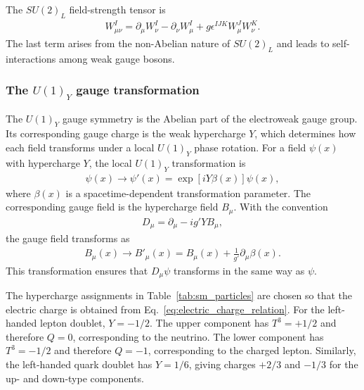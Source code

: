 The $SU(2)_{L}$ field-strength tensor is
\begin{align}
    W_{\mu\nu}^{I}
    =
    \partial_{\mu}W_{\nu}^{I}
    -
    \partial_{\nu}W_{\mu}^{I}
    +
    g\epsilon^{IJK}W_{\mu}^{J}W_{\nu}^{K}.
    \label{eq:su2l_field_strength}
\end{align}
The last term arises from the non-Abelian nature of $SU(2)_{L}$ and leads to self-interactions among weak gauge bosons.


\subsubsection{The $U(1)_{Y}$ gauge transformation}
\label{subsec:u1y_transformation}

The $U(1)_{Y}$ gauge symmetry is the Abelian part of the electroweak gauge group. 
Its corresponding gauge charge is the weak hypercharge $Y$, which determines how each field transforms under a local $U(1)_{Y}$ phase rotation. 
For a field $\psi(x)$ with hypercharge $Y$, the local $U(1)_{Y}$ transformation is
\begin{align}
    \psi(x)
    \rightarrow
    \psi'(x)
    =
    \exp\left[iY\beta(x)\right]\psi(x),
    \label{eq:u1y_matter_transformation}
\end{align}
where $\beta(x)$ is a spacetime-dependent transformation parameter. 
The corresponding gauge field is the hypercharge field $B_{\mu}$. 
With the convention
\begin{align}
    D_{\mu}
    =
    \partial_{\mu}
    -
    ig'YB_{\mu},
    \label{eq:u1y_covariant_derivative}
\end{align}
the gauge field transforms as
\begin{align}
    B_{\mu}(x)
    \rightarrow
    B'_{\mu}(x)
    =
    B_{\mu}(x)
    +
    \frac{1}{g'}\partial_{\mu}\beta(x).
    \label{eq:u1y_gauge_field_transformation}
\end{align}
This transformation ensures that $D_{\mu}\psi$ transforms in the same way as $\psi$.

The hypercharge assignments in Table~\ref{tab:sm_particles} are chosen so that the electric charge is obtained from Eq.~\eqref{eq:electric_charge_relation}. 
For the left-handed lepton doublet, $Y=-1/2$. 
The upper component has $T^{3}=+1/2$ and therefore $Q=0$, corresponding to the neutrino. 
The lower component has $T^{3}=-1/2$ and therefore $Q=-1$, corresponding to the charged lepton. 
Similarly, the left-handed quark doublet has $Y=1/6$, giving charges $+2/3$ and $-1/3$ for the up- and down-type components.

